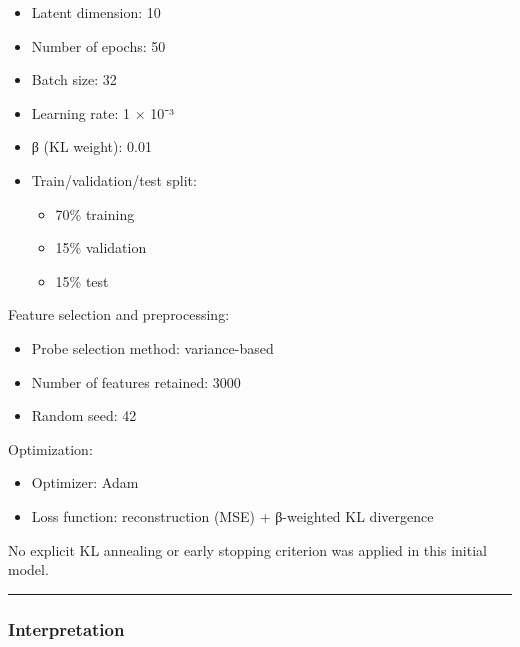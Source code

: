\documentclass[
  letterpaper,
  DIV=11,
  numbers=noendperiod,
  openany,
  oneside]{scrreprt}
\providecommand{\tightlist}{%
  \setlength{\itemsep}{0pt}\setlength{\parskip}{0pt}}
\begin{document}
\begin{itemize}
\tightlist
\item
  Latent dimension: 10\\
\item
  Number of epochs: 50\\
\item
  Batch size: 32\\
\item
  Learning rate: 1 × 10⁻³\\
\item
  β (KL weight): 0.01\\
\item
  Train/validation/test split:

  \begin{itemize}
  \tightlist
  \item
    70\% training
  \item
    15\% validation
  \item
    15\% test
  \end{itemize}
\end{itemize}

Feature selection and preprocessing:

\begin{itemize}
\tightlist
\item
  Probe selection method: variance-based\\
\item
  Number of features retained: 3000\\
\item
  Random seed: 42
\end{itemize}

Optimization:

\begin{itemize}
\tightlist
\item
  Optimizer: Adam\\
\item
  Loss function: reconstruction (MSE) + β-weighted KL divergence
\end{itemize}

No explicit KL annealing or early stopping criterion was applied in this
initial model.

\begin{center}\rule{0.5\linewidth}{0.5pt}\end{center}

\subsubsection{Interpretation}\label{interpretation}
\end{document}
